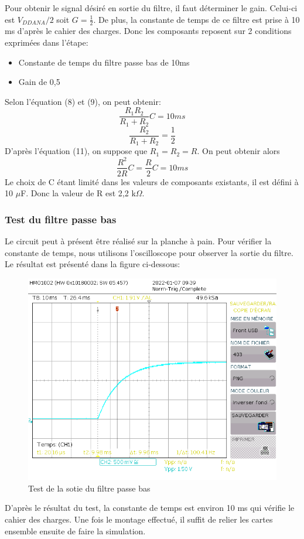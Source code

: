 \documentclass[a4paper]{article}
\begin{document}
	Pour obtenir le signal désiré en sortie du filtre, il faut déterminer le gain. Celui-ci est $V_{DDANA}/2$ soit $G={\frac 12}$. De plus, la constante de temps de ce filtre est prise à 10 ms d’après le cahier des charges. Donc les composants reposent sur 2 conditions exprimées dans l’étape:
	\begin{itemize}
		\item {Constante de temps du filtre passe bas de 10ms }
		\item {Gain de 0,5}
	\end{itemize}
	Selon l'équation (8) et (9), on peut obtenir:
    \begin{equation}
		{\frac {R_{1}R_{2}} {R_{1}+R_{2}}}C = 10 ms
	\end{equation}
	\begin{equation}
		{\frac {R_{2}} {R_{1}+R_{2}}} = {\frac {1}{2}}
	\end{equation}
	D'après l'équation (11), on suppose que $R_{1}=R_{2}=R$. On peut obtenir alors 
	 \begin{equation}
		{\frac {R^2}{2R}} C={\frac {R}{2}}C = 10 ms
	\end{equation}
	Le choix de C étant limité dans les valeurs de composants existants, il est défini à 10 $\mu$F. Donc la valeur de R est 2,2 k$\Omega$. 
	\subsubsection{Test du filtre passe bas}
	Le circuit peut à présent être réalisé sur la planche à pain. Pour vérifier la constante de temps, nous utilisons l'oscilloscope pour observer la sortie du filtre. Le résultat est présenté dans la figure ci-dessous:
	\begin{figure}[H]
	\centering
	\includegraphics[width=0.8\linewidth]{test_filtre passe bas.PNG}
	\caption{Test de la sotie du filtre passe bas}
    \end{figure}
	D'après le résultat du test, la constante de temps est environ 10 ms qui vérifie le cahier des charges. Une fois le montage effectué, il suffit de relier les cartes ensemble ensuite de faire la simulation.
	
\end{document}
